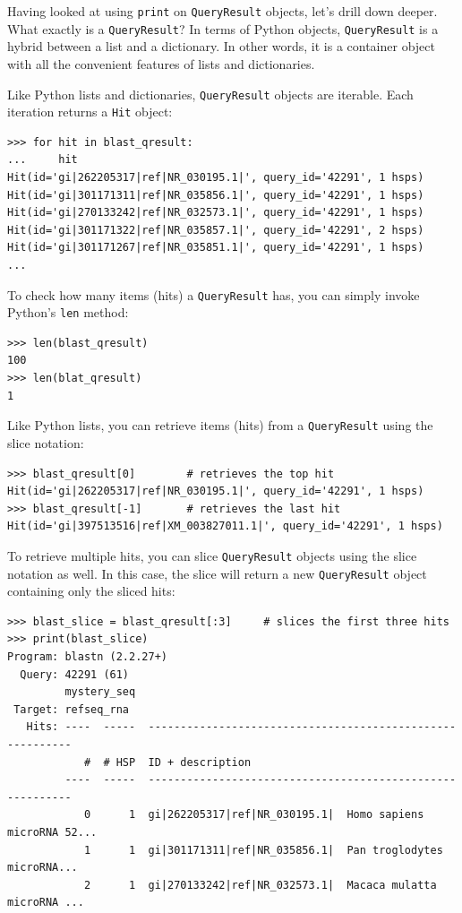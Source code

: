 \documentclass{report}
\begin{document}
Having looked at using \verb|print| on \verb|QueryResult| objects, let's drill
down deeper. What exactly is a \verb|QueryResult|? In terms of Python objects,
\verb|QueryResult| is a hybrid between a list and a dictionary. In other words,
it is a container object with all the convenient features of lists and
dictionaries.

Like Python lists and dictionaries, \verb|QueryResult| objects are iterable.
Each iteration returns a \verb|Hit| object:

\begin{verbatim}
>>> for hit in blast_qresult:
...     hit
Hit(id='gi|262205317|ref|NR_030195.1|', query_id='42291', 1 hsps)
Hit(id='gi|301171311|ref|NR_035856.1|', query_id='42291', 1 hsps)
Hit(id='gi|270133242|ref|NR_032573.1|', query_id='42291', 1 hsps)
Hit(id='gi|301171322|ref|NR_035857.1|', query_id='42291', 2 hsps)
Hit(id='gi|301171267|ref|NR_035851.1|', query_id='42291', 1 hsps)
...
\end{verbatim}

To check how many items (hits) a \verb|QueryResult| has, you can simply invoke
Python's \verb|len| method:

\begin{verbatim}
>>> len(blast_qresult)
100
>>> len(blat_qresult)
1
\end{verbatim}

Like Python lists, you can retrieve items (hits) from a \verb|QueryResult| using
the slice notation:

\begin{verbatim}
>>> blast_qresult[0]        # retrieves the top hit
Hit(id='gi|262205317|ref|NR_030195.1|', query_id='42291', 1 hsps)
>>> blast_qresult[-1]       # retrieves the last hit
Hit(id='gi|397513516|ref|XM_003827011.1|', query_id='42291', 1 hsps)
\end{verbatim}

To retrieve multiple hits, you can slice \verb|QueryResult| objects using the
slice notation as well. In this case, the slice will return a new
\verb|QueryResult| object containing only the sliced hits:

\begin{verbatim}
>>> blast_slice = blast_qresult[:3]     # slices the first three hits
>>> print(blast_slice)
Program: blastn (2.2.27+)
  Query: 42291 (61)
         mystery_seq
 Target: refseq_rna
   Hits: ----  -----  ----------------------------------------------------------
            #  # HSP  ID + description
         ----  -----  ----------------------------------------------------------
            0      1  gi|262205317|ref|NR_030195.1|  Homo sapiens microRNA 52...
            1      1  gi|301171311|ref|NR_035856.1|  Pan troglodytes microRNA...
            2      1  gi|270133242|ref|NR_032573.1|  Macaca mulatta microRNA ...
\end{verbatim}
\end{document}
